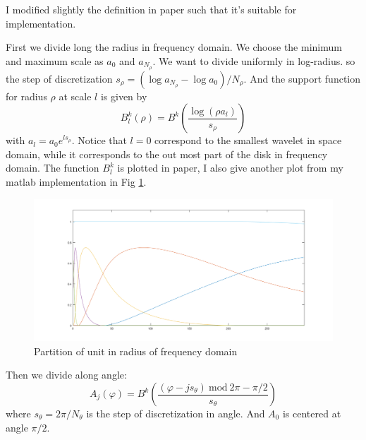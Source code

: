 \documentclass{article}
\begin{document}
	I modified slightly the definition in paper such that it's suitable for implementation.
	
	First we divide long the radius in frequency domain. We choose the minimum and maximum scale as $a_0$ and $a_{N_\rho}$. We want to divide uniformly in log-radius. so the step of discretization $s_\rho=(\log a_{N_\rho} - \log a_0)/N_\rho$. And the support function for radius $\rho$ at scale $l$ is given by
	\begin{equation}
	B_l^k(\rho) = B^k(\frac{\log (\rho a_l
		)}{s_\rho})
	\end{equation}
	with $a_l = a_0 e^{ls_\rho}$.
	Notice that $l=0$ correspond to the smallest wavelet in space domain, while it corresponds to the out most part of the disk in frequency domain. The function $B^k_l$ is plotted in paper, I also give another plot from my matlab implementation in Fig \ref{fig:Bkl}.
	
	\begin{figure}[h]
		\centering
		\includegraphics[width=12cm]{scales.png}
		\caption{Partition of unit in radius of frequency domain}
		\label{fig:Bkl}
	\end{figure}
	
	
	Then we divide along angle: 
	\begin{equation}
	A_j(\varphi) = B^k(\frac{(\varphi-j s_\theta)\ \text{mod}\ 2\pi - \pi/2}{s_\theta})
	\end{equation}
	where $s_\theta = 2\pi/N_\theta$ is the step of discretization in angle. And $A_0$ is centered at angle $\pi/2$.
	
\end{document}
